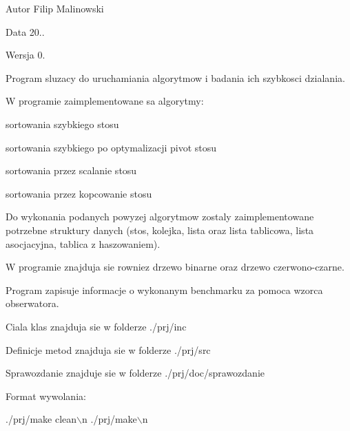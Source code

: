 \begin{DoxyAuthor}{Autor}
Filip Malinowski 
\end{DoxyAuthor}
\begin{DoxyDate}{Data}
20.. 
\end{DoxyDate}
\begin{DoxyVersion}{Wersja}
0.
\end{DoxyVersion}
Program sluzacy do uruchamiania algorytmow i badania ich szybkosci dzialania.\par
W programie zaimplementowane sa algorytmy\-:\par

\begin{DoxyItemize}
\item sortowania szybkiego stosu\par

\item sortowania szybkiego po optymalizacji pivot stosu\par

\item sortowania przez scalanie stosu\par

\item sortowania przez kopcowanie stosu
\end{DoxyItemize}

Do wykonania podanych powyzej algorytmow zostaly zaimplementowane potrzebne struktury danych (stos, kolejka, lista oraz lista tablicowa, lista asocjacyjna, tablica z haszowaniem).\par
\par
W programie znajduja sie rowniez drzewo binarne oraz drzewo czerwono-\/czarne.\par
\par
Program zapisuje informacje o wykonanym benchmarku za pomoca wzorca obserwatora.\par
\par
Ciala klas znajduja sie w folderze ./prj/inc\par
Definicje metod znajduja sie w folderze ./prj/src\par
Sprawozdanie znajduje sie w folderze ./prj/doc/sprawozdanie\par
\par
Format wywolania\-:\par

\begin{DoxyCode}
./prj/make clean\(\backslash\)n
./prj/make\(\backslash\)n
\end{DoxyCode}
 